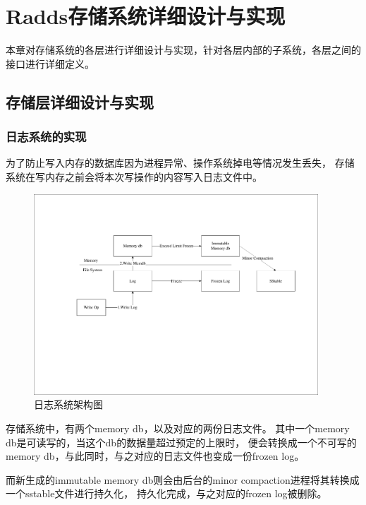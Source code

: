 \section{Radds存储系统详细设计与实现}

	本章对存储系统的各层进行详细设计与实现，针对各层内部的子系统，各层之间的接口进行详细定义。
	
  	\subsection{存储层详细设计与实现}
	


	  \subsubsection{日志系统的实现}
    
	  为了防止写入内存的数据库因为进程异常、操作系统掉电等情况发生丢失，
	  存储系统在写内存之前会将本次写操作的内容写入日志文件中。

   \begin{figure}[H]
	   \centering
	   \includegraphics[width=0.95\textwidth]{pdf/two_log.pdf}
	   \caption{日志系统架构图}
	   \label{two_log}
   \end{figure}
   存储系统中，有两个memory db，以及对应的两份日志文件。
   其中一个memory db是可读写的，当这个db的数据量超过预定的上限时，
   便会转换成一个不可写的memory db，与此同时，与之对应的日志文件也变成一份frozen log。

   而新生成的immutable memory db则会由后台的minor compaction进程将其转换成一个sstable文件进行持久化，
   持久化完成，与之对应的frozen log被删除。

